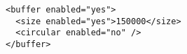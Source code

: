 \begin{verbatim}
<buffer enabled="yes">
  <size enabled="yes">150000</size>
  <circular enabled="no" />
</buffer>
\end{verbatim}
